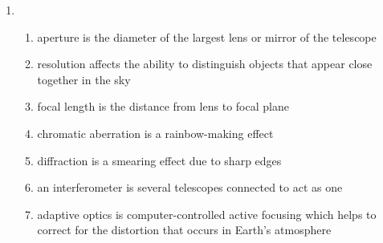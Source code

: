 \documentclass[../hw2.tex]{subfiles}
\begin{document}

    \begin{enumerate}
        \item \begin{enumerate}
            \item aperture is  the diameter of the largest lens or mirror of the telescope
            \item resolution affects the  ability to distinguish objects that appear close together in the sky
            \item focal length is  the distance from lens to focal plane
            \item chromatic aberration is  a rainbow-making effect
            \item diffraction is  a smearing effect due to sharp edges
            \item an interferometer is  several telescopes connected to act as one
            \item adaptive optics is  computer-controlled active focusing which helps to correct for the distortion that occurs in Earth's atmosphere
        \end{enumerate}
    \end{enumerate}
\end{document}
